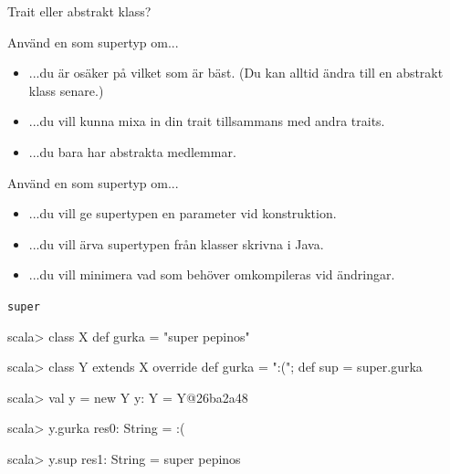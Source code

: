 \begin{Slide}{Trait eller abstrakt klass?} 
\SlideFontSmall
\label{slideW07:traitorclass}
\begin{multicols}{2}
Använd en  som supertyp om...
\begin{itemize}
\item ...du är osäker på vilket som är bäst. (Du kan alltid ändra till en abstrakt klass senare.)
\item ...du vill kunna mixa in din trait tillsammans med andra traits.
\item ...du bara har abstrakta medlemmar. 
\end{itemize}

\columnbreak

Använd en  som supertyp om...
\begin{itemize}
\item ...du vill ge supertypen en parameter vid konstruktion.
\item ...du vill ärva supertypen från klasser skrivna i Java.
\item ...du vill minimera vad som behöver omkompileras vid ändringar. 
\end{itemize}


\end{multicols}
\end{Slide}



\begin{Slide}{\texttt{super}}
\begin{REPL}
scala> class X { def gurka = "super pepinos" }

scala> class Y extends X { override def gurka = ":("; def sup = super.gurka }

scala> val y = new Y
y: Y = Y@26ba2a48

scala> y.gurka
res0: String = :(
\end{REPL}

\pause
\begin{REPLnonum}
scala> y.sup
res1: String = super pepinos

\end{REPLnonum}


\pause
{}

\end{Slide}


